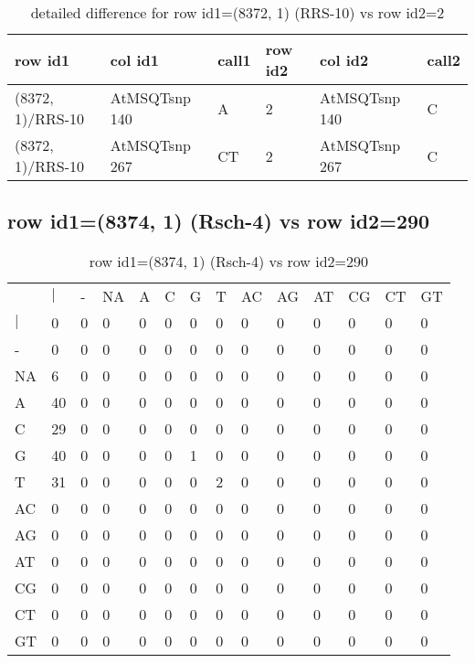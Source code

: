 \begin{center}
\begin{longtable}{|l|l|l|l|l|l|}
\caption{detailed difference for row id1=(8372, 1) (RRS-10) vs row id2=2} \label{table_dm407}\\
\hline
row id1&col id1&call1&row id2&col id2&call2\\
\hline
(8372, 1)/RRS-10&AtMSQTsnp 140&A&2&AtMSQTsnp 140&C\\
(8372, 1)/RRS-10&AtMSQTsnp 267&CT&2&AtMSQTsnp 267&C\\
\hline
\end{longtable}
\end{center}

\subsection{row id1=(8374, 1) (Rsch-4) vs row id2=290}
\begin{center}
\begin{longtable}{|l|l|l|l|l|l|l|l|l|l|l|l|l|l|}
\caption{row id1=(8374, 1) (Rsch-4) vs row id2=290} \label{table_dm408}\\
\hline
\\
\hline
&$|$&-&NA&A&C&G&T&AC&AG&AT&CG&CT&GT\\
$|$&0&0&0&0&0&0&0&0&0&0&0&0&0\\
-&0&0&0&0&0&0&0&0&0&0&0&0&0\\
NA&6&0&0&0&0&0&0&0&0&0&0&0&0\\
A&40&0&0&0&0&0&0&0&0&0&0&0&0\\
C&29&0&0&0&0&0&0&0&0&0&0&0&0\\
G&40&0&0&0&0&1&0&0&0&0&0&0&0\\
T&31&0&0&0&0&0&2&0&0&0&0&0&0\\
AC&0&0&0&0&0&0&0&0&0&0&0&0&0\\
AG&0&0&0&0&0&0&0&0&0&0&0&0&0\\
AT&0&0&0&0&0&0&0&0&0&0&0&0&0\\
CG&0&0&0&0&0&0&0&0&0&0&0&0&0\\
CT&0&0&0&0&0&0&0&0&0&0&0&0&0\\
GT&0&0&0&0&0&0&0&0&0&0&0&0&0\\
\hline
\end{longtable}
\end{center}

